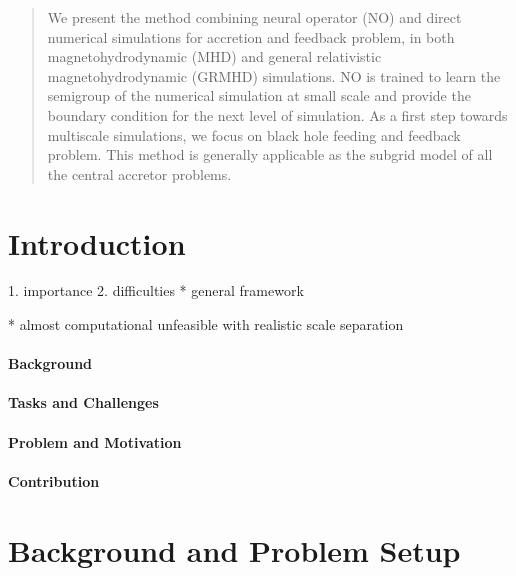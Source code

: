 \documentclass{article}
\newcommand{\hyw}[1]{{\color{red}{[{#1}]}}}
\newcommand{\hywcom}[1]{{\color{purple}{[HYW: #1]}}}
\begin{document}
\begin{CJK*}{UTF8}{gbsn}
\begin{abstract}
We present the method combining neural operator (NO) and direct \hyw{multi-level} numerical simulations for accretion and feedback problem, in both magnetohydrodynamic (MHD) and general relativistic magnetohydrodynamic (GRMHD) simulations. 
NO is trained to learn the semigroup of the numerical simulation at small scale and provide the boundary condition for the next level of simulation.
As a first step towards multiscale simulations, we focus on black hole feeding and feedback problem.
\hyw{Findings:}
This method is generally applicable as the subgrid model of all the central accretor problems.
\end{abstract}



\end{CJK*}

\section{Introduction}
\label{sec:intro}

\hywcom{1-1.5 pages}

1. importance
2. difficulties
* general framework

* almost computational unfeasible with realistic scale separation

\paragraph{Background}

\paragraph{Tasks and Challenges}

\paragraph{Problem and Motivation}

\paragraph{Contribution}

\section{Background and Problem Setup}
\end{document}
